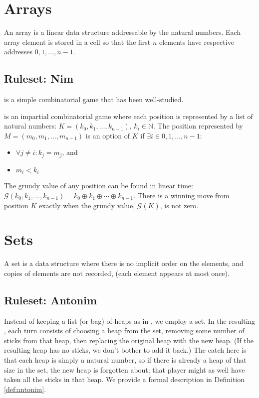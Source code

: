 \documentclass[letter,10pt]{article}
\begin{document}
\section{Arrays}
\label{section:arrays}

An array is a linear data structure addressable by the natural numbers.  Each array element is stored in a cell so that the first $n$ elements have respective addresses $0, 1, \ldots, n-1$.  

\subsection{Ruleset: Nim}

 is a simple combinatorial game that has been well-studied\cite{Bouton:1901}.  
\begin{definition}[Nim]
	\label{def:nim}
	 is an impartial combinatorial game where each position is represented by a list of natural numbers: $K = (k_0, k_1, \ldots, k_{n-1})$, $k_i \in \mathbb{N}$.  The position represented by $M = (m_0, m_1, \ldots, m_{n-1})$ is an option of $K$ if $\exists i \in 0, 1, \ldots, n-1: $
	\begin{itemize}
		\item $\forall j \neq i: k_j = m_j$, and
		\item $m_i < k_i$
	\end{itemize} 
\end{definition}

The grundy value of any  position can be found in linear time: $\mathcal{G}(k_0, k_1, \ldots, k_{n-1})= k_0 \oplus k_1 \oplus \cdots \oplus k_{n-1}$.  There is a winning move from position $K$ exactly when the grundy value, $\mathcal{G}(K)$, is not zero.\cite{Bouton:1901}

\section{Sets}
\label{section:sets}

A set is a data structure where there is no implicit order on the elements, and copies of elements are not recorded, (each element appears at most once).  

\subsection{Ruleset: Antonim}

Instead of keeping a list (or bag) of heaps as in , we employ a set.  In the resulting , each turn consists of choosing a heap from the set, removing some number of sticks from that heap, then replacing the original heap with the new heap.  (If the resulting heap has no sticks, we don't bother to add it back.)  The catch here is that each heap is simply a natural number, so if there is already a heap of that size in the set, the new heap is forgotten about; that player might as well have taken all the sticks in that heap.  We provide a formal description in Definition \ref{def:antonim}.
\end{document}
